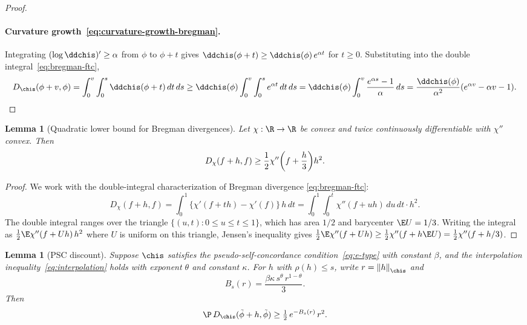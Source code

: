 \documentclass{article}
\newtheorem{lemma}[theorem]{Lemma}
\begin{document}
\begin{proof}
\paragraph{Curvature growth~\eqref{eq:curvature-growth-bregman}.}
Integrating $(\log \ddchis)' \ge \alpha$
from $\phi$ to $\phi + t$
gives
$\ddchis(\phi + t) \ge \ddchis(\phi)\, e^{\alpha t}$
for $t \ge 0$.
Substituting into the double integral~\eqref{eq:bregman-ftc},
\[
D_{\chis}(\phi+v, \phi)
  = \int_0^v \int_0^s \ddchis(\phi + t)\, dt\, ds
  \ge \ddchis(\phi) \int_0^v \int_0^s e^{\alpha t}\, dt\, ds
  = \ddchis(\phi) \int_0^v
      \frac{e^{\alpha s} - 1}{\alpha}\, ds
  = \frac{\ddchis(\phi)}{\alpha^2}(e^{\alpha v} - \alpha v - 1). \qedhere
\]
\end{proof}

\begin{lemma}[Quadratic lower bound for Bregman divergences]
\label{lem:quadratic-bregman}
Let $\chi:\R \to \R$ be convex and twice continuously differentiable with $\chi''$ convex. Then
\begin{equation}
\label{eq:bregman-quadratic}
D_\chi(f+h, f) \ge \frac{1}{2}\chi''\qty(f + \frac{h}{3})h^2.
\end{equation}
\end{lemma}

\begin{proof}
We work with the double-integral characterization of Bregman divergence \eqref{eq:bregman-ftc}:
\[
D_\chi(f+h,f)
  = \int_0^1 \{\chi'(f + th) - \chi'(f)\}\,h\,dt
  = \int_0^1 \int_0^t \chi''(f + uh)\,du\,dt \cdot h^2.
\]
The double integral ranges over the triangle
$\{(u,t) : 0 \le u \le t \le 1\}$,
which has area $1/2$
and barycenter $\E U = 1/3$.
Writing the integral as $\frac{1}{2}\E\chi''(f + Uh)\,h^2$
where $U$ is uniform on this triangle,
Jensen's inequality gives
$\frac{1}{2}\E\chi''(f + Uh)
  \ge \frac{1}{2}\chi''(f + h\E U)
  = \frac{1}{2}\chi''(f + h/3)$.
\end{proof}

\begin{lemma}[PSC discount]
\label{lem:psc-discount}
Suppose $\chis$ satisfies
the pseudo-self-concordance condition~\eqref{eq:e-type}
with constant $\beta$,
and the interpolation inequality~\eqref{eq:interpolation}
holds with exponent $\theta$ and constant $\kappa$.
For $h$ with $\rho(h) \le s$,
write $r = \norm{h}_{\chis}$ and
\begin{equation}
\label{eq:psc-discount}
B_s(r) = \frac{\beta\kappa\, s^\theta\, r^{1-\theta}}{3}.
\end{equation}
Then
\begin{equation}
\label{eq:psc-discount-bound}
\P\, D_{\chis}(\tilde\phi + h, \tilde\phi)
  \ge \tfrac{1}{2}\, e^{-B_s(r)}\, r^2.
\end{equation}
\end{lemma}
\end{document}
